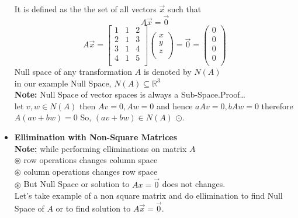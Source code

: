 \documentclass[a4paper,11pt]{article}
\numberwithin{equation}{section}
\begin{document}
\begin{itemize}
    It is defined as the the set of all vectors $\vec{x}$ such that 
\begin{equation}
    A\vec{x}=\vec{0}
\end{equation}
\begin{equation}
    A\vec{x}  =
    \begin{bmatrix}
        1&1&2\\
        2&1&3\\
        3&1&4\\
        4&1&5\\
    \end{bmatrix}
    \begin{pmatrix}
        x\\
        y\\
        z\\
    \end{pmatrix}=\vec{0}=
    \begin{pmatrix}
        0\\0\\0\\0\\
    \end{pmatrix}
\end{equation}
Null space of any transformation $A$ is denoted by $N(A)$\\
in our example Null Space, $N(A)\subseteq \mathbb{R}^3$\\

\textbf{Note: }Null Space of vector spaces is always a Sub-Space.Proof\dots\\

let $v,w\in N(A)$ then $Av=0,Aw=0$ and hence $aAv=0,bAw=0$ therefore $A(av+bw)=0$ So, $(av+bw) \in N(A)$ $\odot $.\\

\item \textbf{Ellimination with Non-Square Matrices}\\

\textbf{Note: }while performing elliminations on matrix $A$ \\

$\circledast$ row operations changes column space\\
$\circledast$ column operations changes row space\\
$\circledast$ But Null Space or solution to $Ax=\vec{0}$ does not changes.\\

Let's take example of a non square matrix and do ellimination to find Null Space of $A$ or to find solution to $A\vec{x}=\vec{0}$.


\end{itemize}
\end{document}
